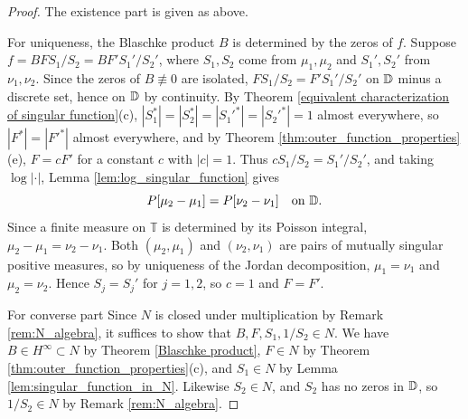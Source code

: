 \begin{proof}
The existence part is given as above.

For uniqueness, the Blaschke product $B$ is determined by the zeros of $f$. Suppose
$f=BFS_1/S_2=BF'S_1'/S_2'$, where $S_1,S_2$ come from $\mu_1,\mu_2$ and $S_1',S_2'$ from
$\nu_1,\nu_2$. Since the zeros of $B\not\equiv 0$ are isolated, $FS_1/S_2=F'S_1'/S_2'$ on $\mathbb{D}$
minus a discrete set, hence on $\mathbb{D}$ by continuity. By Theorem
\ref{equivalent characterization of singular function}(c), $|S_1^*|=|S_2^*|=|S_1'^*|=|S_2'^*|=1$
almost everywhere, so $|F^*|=|F'^*|$ almost everywhere, and by Theorem
\ref{thm:outer_function_properties}(e), $F=cF'$ for a constant $c$ with $|c|=1$. Thus
$cS_1/S_2=S_1'/S_2'$, and taking $\log|\cdot|$, Lemma \ref{lem:log_singular_function} gives
\begin{equation*}
  P[\mu_2-\mu_1]=P[\nu_2-\nu_1]\quad\text{on }\mathbb{D}.
\end{equation*}
Since a finite measure on $\mathbb{T}$ is determined by its Poisson integral,
$\mu_2-\mu_1=\nu_2-\nu_1$. Both $(\mu_2,\mu_1)$ and $(\nu_2,\nu_1)$ are pairs of mutually
singular positive measures, so by uniqueness of the Jordan decomposition, $\mu_1=\nu_1$ and
$\mu_2=\nu_2$. Hence $S_j=S_j'$ for $j=1,2$, so $c=1$ and $F=F'$.

For converse part Since $N$ is closed under multiplication by Remark \ref{rem:N_algebra}, it suffices to show that
$B,F,S_1,1/S_2\in N$. We have $B\in H^\infty\subset N$ by Theorem \ref{Blaschke product},
$F\in N$ by Theorem \ref{thm:outer_function_properties}(c), and $S_1\in N$ by Lemma
\ref{lem:singular_function_in_N}. Likewise $S_2\in N$, and $S_2$ has no zeros in $\mathbb{D}$, so
$1/S_2\in N$ by Remark \ref{rem:N_algebra}.
\end{proof}
